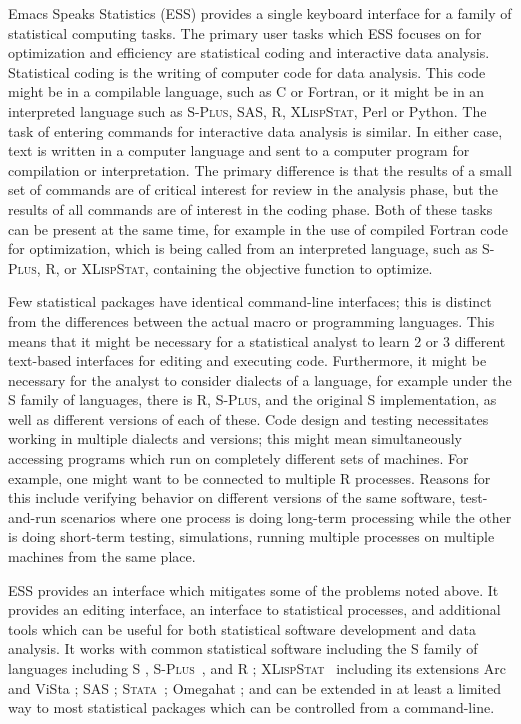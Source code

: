 \documentclass{article}
\newcommand*{\Splus}{\textsc{S-Plus}}
\newcommand*{\XLispStat}{\textsc{XLispStat}}
\newcommand*{\Stata}{\textsc{Stata}}
\begin{document}
Emacs Speaks Statistics (ESS) provides a single keyboard interface for
a family of statistical computing tasks.  The primary user tasks which
ESS focuses on for optimization and efficiency are statistical coding
and interactive data analysis.  Statistical coding is the writing of
computer code for data analysis.  This code might be in a compilable
language, such as C or Fortran, or it might be in an interpreted
language such as \Splus, SAS, R, \XLispStat, Perl or Python.  The task
of entering commands for interactive data analysis is similar.  In
either case, text is written in a computer language and sent to a
computer program for compilation or interpretation.  The primary
difference is that the results of a small set of commands are of
critical interest for review in the analysis phase, but the results of
all commands are of interest in the coding phase.  Both of these tasks
can be present at the same time, for example in the use of compiled
Fortran code for optimization, which is being called from an
interpreted language, such as \Splus, R, or \XLispStat, containing the
objective function to optimize.

Few statistical packages have identical command-line interfaces; this
is distinct from the differences between the actual macro or
programming languages.  This means that it might be necessary for a
statistical analyst to learn 2 or 3 different text-based interfaces
for editing and executing code.  Furthermore, it might be necessary
for the analyst to consider dialects of a language, for example under
the S family of languages, there is R, \Splus, and the original S
implementation, as well as different versions of each of these.  Code
design and testing necessitates working in multiple dialects and
versions; this might mean simultaneously accessing programs which run
on completely different sets of machines.  For example, one might want
to be connected to multiple R processes.  Reasons for this include
verifying behavior on different versions of the same software,
test-and-run scenarios where one process is doing long-term processing
while the other is doing short-term testing, simulations, running
multiple processes on multiple machines from the same place.

ESS provides an interface which mitigates some of the problems noted
above.  It provides an editing interface, an interface to statistical
processes, and additional tools which can be useful for both
statistical software development and data analysis.  It works with
common statistical software including the S family of languages
including S \citep{BecRCW88,ChaJH92,ChaJ98}, \Splus\ \citep{Splus},
and R \citep{ihak:gent:1996}; \XLispStat\ \citep{Tier90} including its
extensions Arc \citep{Cook:Weisberg:1999} and ViSta
\citep{youn:fald:mcfa:1992}; SAS \citep{SAS:8.0}; \Stata\
\citep{Stata:6.0}; Omegahat \citep{DTLang:2000}; and can be extended
in at least a limited way to most statistical packages which can be
controlled from a command-line.
\end{document}
